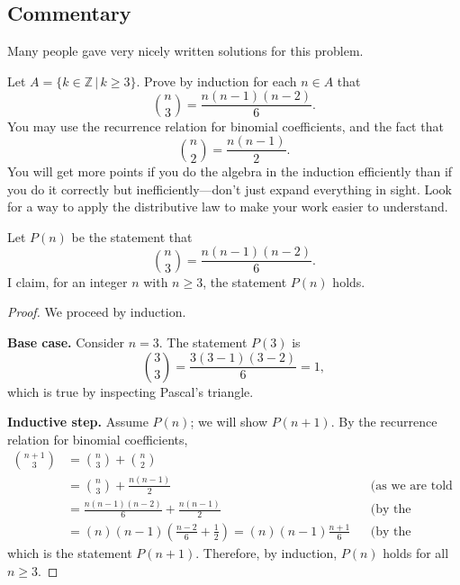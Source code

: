 \documentclass[12pt]{midterm}
\begin{document}
\begin{exam}
\begin{solution}
\begin{solutiontext}
\color{magenta!50!black}
\vfill
\setlength{\leftskip}{0in}
\subsection*{Commentary}

Many people gave very nicely written solutions for this problem.

\end{solutiontext}\end{solution}

\begin{problem}[360]
Let $A = \{ k \in \mathbb{Z}\, |\, k \geq 3 \}$.  Prove by induction for each $n \in A$ that
$$
\binom{n}{3} = \frac{n \left( n - 1 \right) \left( n - 2 \right)}{6}.
$$
You may use the recurrence relation for binomial coefficients, and the fact that
$$
\binom{n}{2} = \frac{n(n-1)}{2}.
$$
You will get more points if you do the algebra in the induction
efficiently than if you do it correctly but inefficiently---don't just
expand everything in sight.  Look for a way to apply the distributive law
to make your work easier to understand.
\end{problem}

\begin{solution}\begin{solutiontext}
Let $P(n)$ be the statement that
      $$\binom{n}{3} = \frac{n \left( n - 1 \right) \left( n - 2 \right)}{6}.$$
      I claim, for an integer $n$ with $n \geq 3$, the statement $P(n)$ holds.
    \begin{proof}
      We proceed by induction.

\textbf{Base case.}  Consider $n = 3$.  The statement $P(3)$ is
      $$\binom{3}{3} = \frac{3 \left( 3 - 1 \right) \left( 3 - 2 \right)}{6} = 1,$$
      which is true by inspecting Pascal's triangle.

\textbf{Inductive step.}  Assume $P(n)$; we will show $P(n+1)$.
By the recurrence relation for binomial coefficients,
\begin{align*}
\binom{n+1}{3} &= \binom{n}{3} + \binom{n}{2} \\
&= \binom{n}{3} + \frac{n(n-1)}{2} && \text{(as we are told we may assume)}\\
&= \frac{n \left( n - 1 \right) \left( n - 2 \right)}{6} + \frac{n(n-1)}{2} && \text{(by the inductive hypothesis)} \\
&= (n)(n-1) \left( \frac{n - 2}{6} + \frac{1}{2} \right) = (n)(n-1) \frac{n + 1}{6}%
&& \text{(by the distributive law)}
\end{align*}
which is the statement $P(n+1)$.  Therefore, by induction, $P(n)$ holds for all $n \geq 3$.
    \end{proof}


\end{solutiontext}
\end{solution}
\end{exam}
\end{document}
